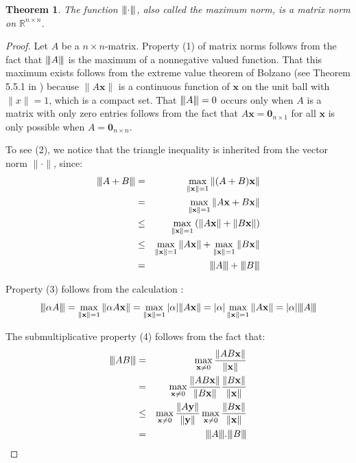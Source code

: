 \documentclass[a4paper,11pt]{report}
\newtheorem{theorem}{Theorem}[section]
\newcommand{\maxnorm}[1]{{\left\vert\kern-0.25ex\left\vert\kern-0.25ex\left\vert #1 
    \right\vert\kern-0.25ex\right\vert\kern-0.25ex\right\vert}}
\newcommand{\R}{{\mathbb R}}
\begin{document}
\begin{theorem}\label{maxnormtheo}
  The function $\maxnorm{\cdot}$, also called the maximum norm, is a matrix norm 
  on $\R^{n\times n}$.
\end{theorem}
\begin{proof}
Let $A$ be a $n \times n$-matrix.  Property (1) of matrix norms follows from the fact that $\maxnorm{A}$ is 
  the maximum of a nonnegative valued function. That this maximum exists follows from the extreme value theorem of Bolzano (see Theorem 5.5.1 in \cite{caenepeel})
    because $\|A\mathbf{x}\|$ is a continuous function of $\mathbf{x}$ on the unit ball with $\|x\|=1$, which is a compact 
    set. That $\maxnorm{A} = 0$ occurs only when $A$ is a matrix with only zero entries 
    follows from the fact that $A\mathbf{x} = \mathbf{0}_{n\times 1}$ for all $\mathbf{x}$ is only possible when $A = \mathbf{0}_{n\times n}$.
    
    
To see (2),  we notice that the triangle inequality is inherited from the vector 
norm $\|\cdot\|$, since:
\begin{eqnarray*}
  \maxnorm{A+B} &=& \max_{\|\mathbf{x}\| = 1} \|(A+B) 
  \mathbf{x}\|\\
  &=& \max_{\|\mathbf{x}\| = 1} \|A\mathbf{x} + B\mathbf{x}\|\\
&\leq& \max_{\|\mathbf{x}\| = 1} \left(\|A\mathbf{x}\| + 
\|B\mathbf{x}\|\right)\\
&\leq& \max_{\|\mathbf{x}\| = 1} \|A\mathbf{x}\| + \max_{\|\mathbf{x}\| = 1} \|B\mathbf{x}\|
\\
&=& \maxnorm{A} + \maxnorm{B}\\
\end{eqnarray*}

Property (3) follows from the calculation :
$$\maxnorm{\alpha A} = \max_{\|\mathbf{x}\| = 1} \|\alpha A\mathbf{x}\| = \max_{\|\mathbf{x}\| = 1} |\alpha|\|A\mathbf{x}\| = |\alpha|\max_{\|\mathbf{x}\| = 1} \|A\mathbf{x}\| = |\alpha|\maxnorm{A}$$
    
The submultiplicative property (4) follows from the fact that:
\begin{eqnarray*}
  \maxnorm{AB} &=& \max_{\mathbf{x} \not = 0}\frac{\|AB\mathbf{x}\|}{\|\mathbf{x}\|}\\
  &=& \max_{\mathbf{x} \not = 0}\frac{\|AB\mathbf{x}\|}{\|B\mathbf{x}\|}\frac{\|B\mathbf{x}\|}{\|\mathbf{x}\|}\\
  &\leq& \max_{\mathbf{x}\not = 0}\frac{\|A\mathbf{y}\|}{\|\mathbf{y}\|}\max_{\mathbf{x}\not = 0}\frac{\|B\mathbf{x}\|}{\|\mathbf{x}\|}\\
  &=& \maxnorm{A}.\maxnorm{B}
\end{eqnarray*}   
  \end{proof}
\end{document}
